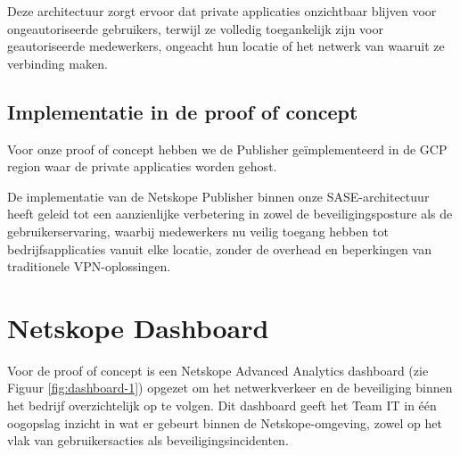 Deze architectuur zorgt ervoor dat private applicaties onzichtbaar blijven voor ongeautoriseerde gebruikers, terwijl ze volledig toegankelijk zijn voor geautoriseerde medewerkers, ongeacht hun locatie of het netwerk van waaruit ze verbinding maken.

\subsection{Implementatie in de proof of concept}

Voor onze proof of concept hebben we de Publisher geïmplementeerd in de GCP region waar de private applicaties worden gehost.

\vspace{2ex}

De implementatie van de Netskope Publisher binnen onze SASE-architectuur heeft geleid tot een aanzienlijke verbetering in zowel de beveiligingsposture als de gebruikerservaring, waarbij medewerkers nu veilig toegang hebben tot bedrijfsapplicaties vanuit elke locatie, zonder de overhead en beperkingen van traditionele VPN-oplossingen.

\section{Netskope Dashboard}
Voor de proof of concept is een Netskope Advanced Analytics dashboard (zie Figuur \ref{fig:dashboard-1}) opgezet om het netwerkverkeer en de beveiliging binnen het bedrijf overzichtelijk op te volgen. Dit dashboard geeft het Team IT in één oogopslag inzicht in wat er gebeurt binnen de Netskope-omgeving, zowel op het vlak van gebruikersacties als beveiligingsincidenten.

